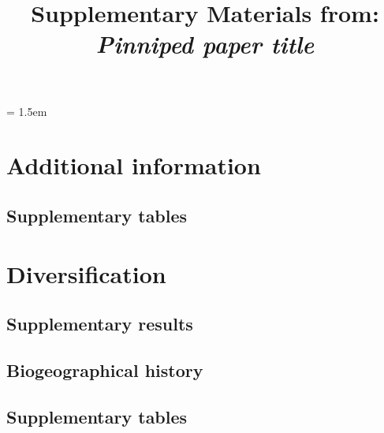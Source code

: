 \documentclass[a4paper, 12pt]{article}
\title{Supplementary Materials from: \textit{Pinniped paper title}}
\author{}
\date{}
\begin{document}
\maketitle

\tableofcontents

\parindent = 1.5em
\addtolength{\parskip}{.3em}

\newpage
\section{Additional information}
\subsection{Supplementary tables}



\newpage
\section{Diversification}
\subsection{Supplementary results}


\newpage
\begin{landscape}
\section{Biogeographical history}
\subsection{Supplementary tables}



\newpage


\newpage

\end{landscape}
\end{document}
